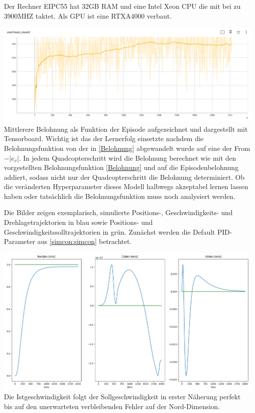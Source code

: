 \vspace*{0.5cm}
Der Rechner EIPC55 hat 32GB RAM und eine Intel Xeon CPU die mit bei zu 3900MHZ taktet. Als GPU ist eine RTXA4000 verbaut.
\begin{center}
	\includegraphics[scale=0.38]{../images/0089 PID Lernen.png}{\\Mittlerere Belohnung als Funktion der Episode aufgezeichnet und dargestellt mit Tensorboard. Wichtig ist das der Lernerfolg einsetzte nachdem die Belohnungsfunktion von der in \ref{Belohnung} abgewandelt wurde auf eine der From $-|e_v|$. In jedem Quadcopterschritt wird die Belohnung berechnet wie mit den vorgestellten Belohnungsfunktion \ref{Belohnung} und auf die Episodenbelohnung addiert, sodass nicht nur der Quadcopterschritt die Belohnung determiniert. Ob die veränderten Hyperparameter dieses Modell halbwegs akzeptabel lernen lassen haben oder tatsächlich die Belohnungsfunktion muss noch analysiert werden.}
\end{center}
\pagebreak 
Die Bilder zeigen exemplarisch, simulierte Positions-, Geschwindigkeits- und Drehlagetrajektorien in blau sowie Positions- und Geschwindigkeitssolltrajektorien in grün. Zunächst werden die Default PID-Parameter aus \ref{simcon:simcon} betrachtet.
\begin{center}
	\includegraphics[scale=0.25]{../images/0096 Geschwindigkeit.png}{\\Die Istgeschwindigkeit folgt der Sollgeschwindigkeit in erster Näherung perfekt bis auf den unerwarteten verbleibenden Fehler auf der Nord-Dimension.}
\end{center}
